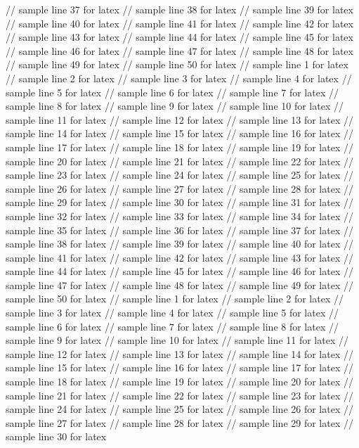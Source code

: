 // sample line 37 for latex
// sample line 38 for latex
// sample line 39 for latex
// sample line 40 for latex
// sample line 41 for latex
// sample line 42 for latex
// sample line 43 for latex
// sample line 44 for latex
// sample line 45 for latex
// sample line 46 for latex
// sample line 47 for latex
// sample line 48 for latex
// sample line 49 for latex
// sample line 50 for latex
// sample line 1 for latex
// sample line 2 for latex
// sample line 3 for latex
// sample line 4 for latex
// sample line 5 for latex
// sample line 6 for latex
// sample line 7 for latex
// sample line 8 for latex
// sample line 9 for latex
// sample line 10 for latex
// sample line 11 for latex
// sample line 12 for latex
// sample line 13 for latex
// sample line 14 for latex
// sample line 15 for latex
// sample line 16 for latex
// sample line 17 for latex
// sample line 18 for latex
// sample line 19 for latex
// sample line 20 for latex
// sample line 21 for latex
// sample line 22 for latex
// sample line 23 for latex
// sample line 24 for latex
// sample line 25 for latex
// sample line 26 for latex
// sample line 27 for latex
// sample line 28 for latex
// sample line 29 for latex
// sample line 30 for latex
// sample line 31 for latex
// sample line 32 for latex
// sample line 33 for latex
// sample line 34 for latex
// sample line 35 for latex
// sample line 36 for latex
// sample line 37 for latex
// sample line 38 for latex
// sample line 39 for latex
// sample line 40 for latex
// sample line 41 for latex
// sample line 42 for latex
// sample line 43 for latex
// sample line 44 for latex
// sample line 45 for latex
// sample line 46 for latex
// sample line 47 for latex
// sample line 48 for latex
// sample line 49 for latex
// sample line 50 for latex
// sample line 1 for latex
// sample line 2 for latex
// sample line 3 for latex
// sample line 4 for latex
// sample line 5 for latex
// sample line 6 for latex
// sample line 7 for latex
// sample line 8 for latex
// sample line 9 for latex
// sample line 10 for latex
// sample line 11 for latex
// sample line 12 for latex
// sample line 13 for latex
// sample line 14 for latex
// sample line 15 for latex
// sample line 16 for latex
// sample line 17 for latex
// sample line 18 for latex
// sample line 19 for latex
// sample line 20 for latex
// sample line 21 for latex
// sample line 22 for latex
// sample line 23 for latex
// sample line 24 for latex
// sample line 25 for latex
// sample line 26 for latex
// sample line 27 for latex
// sample line 28 for latex
// sample line 29 for latex
// sample line 30 for latex
